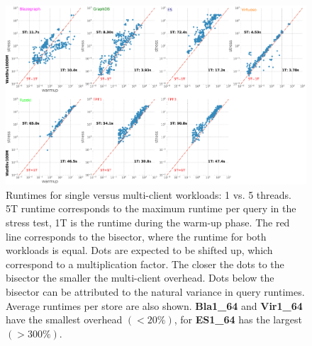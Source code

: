 \begin{figure}[htbp!]
	\centering
	\includegraphics[width=0.90\linewidth]{imgs/Fig07_Watdiv_SingleMultiClient}
	\caption{Runtimes for single versus multi-client workloads: 1 vs. 5 threads. 
		5T runtime corresponds to the maximum runtime per query in the stress test, 1T is the runtime during the warm-up phase. The red line corresponds to the bisector, where the runtime for both workloads is equal. Dots are expected to be shifted up, which correspond to a multiplication factor. The closer the dots to the bisector the smaller the multi-client overhead. Dots below the bisector can be attributed to the natural variance in query runtimes. Average runtimes per store are also shown. \textbf{Bla1\_64} and \textbf{Vir1\_64} have the smallest overhead $(< 20\%)$, for \textbf{ES1\_64} has the largest $(> 300\%)$.
	}
	\label{fig:Fig07_Watdiv_SingleMultiClient}
\end{figure}
%
